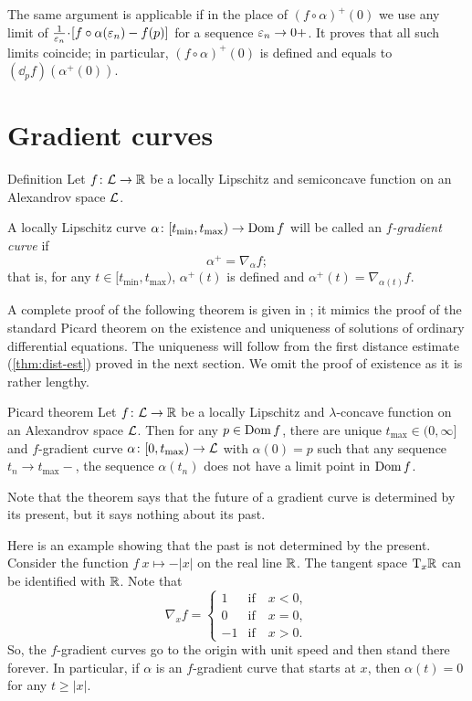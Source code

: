 The same argument is applicable if in the place of $(f\circ\alpha)^+(0)$
we use any limit of $\tfrac1{\eps_n}\cdot [f\circ\alpha(\eps_n)-f(p)]$ for a sequence $\varepsilon_n\to 0+$.
It proves that all such limits coincide; in particular, $(f\circ\alpha)^+(0)$ is defined and equals to $(\dd_pf)(\alpha^+(0))$.
\qeds


\section{Gradient curves}

\begin{thm}{Definition}\label{def:grad-curve}
Let $f\colon\mathcal{L}\to\mathbb{R}$ be a locally Lipschitz and semiconcave function on an Alexandrov space
$\mathcal{L}$.

A locally Lipschitz curve $\alpha\colon[t_{\min},t_{\max})\to\mathop{\rm Dom}\nolimits f$ will be called an \emph{$f$-gradient curve} if
\[\alpha^+=\nabla_{\alpha} f;\]
that is, for any $t\in[t_{\min},t_{\max})$, $\alpha^+(t)$ is defined and 
$\alpha^+(t)=\nabla_{\alpha(t)} f$.
\end{thm}

A complete proof of the following theorem is given in \cite{alexander-kapovitch-petrunin2024}; 
it mimics the proof of the standard Picard theorem on the existence  and uniqueness of solutions of ordinary differential equations.
The uniqueness will follow from the first distance estimate (\ref{thm:dist-est}) proved in the next section.
We omit the proof of existence as it is rather lengthy.

\begin{thm}{Picard theorem}\label{thm:glob-exist-grad-curv}
Let $f\colon\mathcal{L}\to \mathbb{R}$ be a locally Lipschitz and $\lambda$-concave function on an Alexandrov space $\mathcal{L}$.
Then for any $p\in \mathop{\rm Dom}\nolimits f$, there are unique $t_{\max}\in(0,\infty]$ and $f$-gradient curve $\alpha\colon[0,t_{\max})\to \mathcal{L}$ with $\alpha(0)=p$ such that any sequence $t_n\to t_{\max}-$, the sequence $\alpha(t_n)$ does not have a limit point in $\mathop{\rm Dom}\nolimits f$.
\end{thm}

Note that the theorem says that the future of a gradient curve is determined by its present, but it says nothing about its past.

Here is an example showing that the past is not determined by the present.
Consider the function $f\:x\mapsto -|x|$ on the real line $\mathbb{R}$.
The tangent space $\mathrm{T}_x\mathbb{R}$ can be identified with $\mathbb{R}$.
Note that 
\[\nabla_xf=
\begin{cases}
1&\text{if}\quad x<0,
\\
0&\text{if}\quad x=0,
\\
-1&\text{if}\quad x>0.
\end{cases}
\]
So, the $f$-gradient curves go to the origin with unit speed and then stand there forever.
In particular, if $\alpha$ is an $f$-gradient curve that starts at $x$,
then $\alpha(t)=0$ for any $t\ge |x|$.

